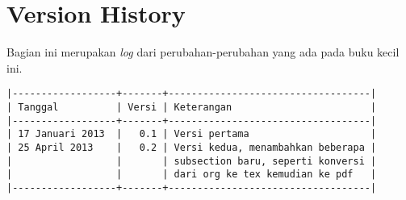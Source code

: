 \documentclass{article}
\begin{document}
\section{Version History}
Bagian ini merupakan \emph{log} dari perubahan-perubahan yang ada pada buku
kecil ini.

\begin{verbatim}
|------------------+-------+-----------------------------------|
| Tanggal          | Versi | Keterangan                        |
|------------------+-------+-----------------------------------|
| 17 Januari 2013  |   0.1 | Versi pertama                     |
| 25 April 2013    |   0.2 | Versi kedua, menambahkan beberapa |
|                  |       | subsection baru, seperti konversi |
|                  |       | dari org ke tex kemudian ke pdf   |
|------------------+-------+-----------------------------------|
\end{verbatim}
\end{document}
